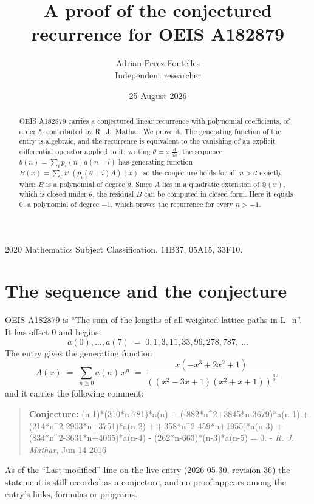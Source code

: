 \documentclass[11pt,a4paper]{article}
\title{A proof of the conjectured recurrence for OEIS A182879}
\author{Adrian Perez Fontelles\\ \small Independent researcher}
\date{25 August 2026}
\theoremstyle{plain}
\theoremstyle{definition}
\begin{document}
\maketitle

\begin{abstract}
OEIS A182879 carries a conjectured linear recurrence with polynomial coefficients, of
order 5, contributed by R.~J.~Mathar. We prove it. The generating function of the
entry is algebraic, and the recurrence is equivalent to the vanishing of an explicit
differential operator applied to it: writing $\theta=x\,\frac{d}{dx}$, the sequence
$b(n)=\sum_{i}p_{i}(n)a(n-i)$ has generating function
$B(x)=\sum_{i}x^{i}\,(p_{i}(\theta+i)A)(x)$, so the conjecture holds for all $n>d$ exactly
when $B$ is a polynomial of degree $d$. Since $A$ lies in a quadratic extension of
$\mathbb{Q}(x)$, which is closed under $\theta$, the residual $B$ can be computed in
closed form. Here it equals $0$, a polynomial of degree $-1$, which proves
the recurrence for every $n>-1$.
\end{abstract}

\noindent\small 2020 Mathematics Subject Classification. 11B37, 05A15, 33F10.\normalsize

\section{The sequence and the conjecture}

OEIS A182879 is ``The sum of the lengths of all weighted lattice paths in L\_n''. It has offset $0$ and begins
\[
a(0),\dots,a(7)\;=\;0, 1, 3, 11, 33, 96, 278, 787,\ \dots
\]
The entry gives the generating function
\begin{equation}\label{eq:gf}
A(x)\;=\;\sum_{n\ge 0} a(n)\,x^{n}\;=\;\frac{x \left(- x^{3} + 2 x^{2} + 1\right)}{\left(\left(x^{2} - 3 x + 1\right) \left(x^{2} + x + 1\right)\right)^{\frac{3}{2}}} ,
\end{equation}
and it carries the following comment:
\begin{quote}\small
\textbf{Conjecture:} (n-1)*(310*n-781)*a(n) + (-882*n\^{}2+3845*n-3679)*a(n-1) + (214*n\^{}2-2903*n+3751)*a(n-2) + (-358*n\^{}2-459*n+1955)*a(n-3) + (834*n\^{}2-3631*n+4065)*a(n-4) - (262*n-663)*(n-3)*a(n-5) = 0. - \emph{R. J. Mathar}, Jun 14 2016
\end{quote}
As of the ``Last modified'' line on the live entry (2026-05-30, revision 36) the
statement is still recorded as a conjecture, and no proof appears among the entry's links,
formulas or programs.
\end{document}
